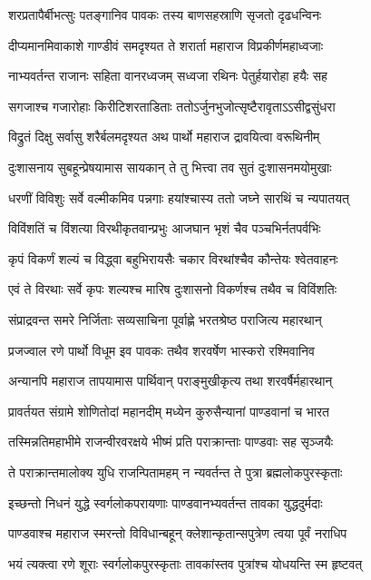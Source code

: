 \twolineshloka
{शरप्रतापैर्बीभत्सुः पतङ्गानिव पावकः}
{तस्य बाणसहस्राणि सृजतो दृढधन्विनः}


\twolineshloka
{दीप्यमानमिवाकाशे गाण्डीवं समदृश्यत}
{ते शरार्ता महाराज विप्रकीर्णमहाध्वजाः}


\twolineshloka
{नाभ्यवर्तन्त राजानः सहिता वानरध्वजम्}
{सध्वजा रथिनः पेतुर्हयारोहा हयैः सह}


\twolineshloka
{सगजाश्च गजारोहाः किरीटिशरताडिताः}
{ततोऽर्जुनभुजोत्सृष्टैरावृताऽऽसीद्वसुंधरा}


\twolineshloka
{विद्रुतं दिक्षु सर्वासु शरैर्बलमदृश्यत}
{अथ पार्थो महाराज द्रावयित्वा वरूथिनीम्}


\twolineshloka
{दुःशासनाय सुबहून्प्रेषयामास सायकान्}
{ते तु भित्त्वा तव सुतं दुःशासनमयोमुखाः}


\twolineshloka
{धरणीं विविशुः सर्वे वल्मीकमिव पन्नगाः}
{हयांश्चास्य ततो जघ्ने सारथिं च न्यपातयत्}


\twolineshloka
{विविंशतिं च विंशत्या विरथीकृतवान्प्रभुः}
{आजघान भृशं चैव पञ्चभिर्नतपर्वभिः}


\twolineshloka
{कृपं विकर्णं शल्यं च विद्ध्वा बहुभिरायसैः}
{चकार विरथांश्चैव कौन्तेयः श्वेतवाहनः}


\twolineshloka
{एवं ते विरथाः सर्वे कृपः शल्यश्च मारिष}
{दुःशासनो विकर्णश्च तथैव च विविंशतिः}


\twolineshloka
{संप्राद्रवन्त समरे निर्जिताः सव्यसाचिना}
{पूर्वाह्णे भरतश्रेष्ठ पराजित्य महारथान्}


\twolineshloka
{प्रजज्वाल रणे पार्थो विधूम इव पावकः}
{तथैव शरवर्षेण भास्करो रश्मिवानिव}


\twolineshloka
{अन्यानपि महाराज तापयामास पार्थिवान्}
{पराङ्मुखीकृत्य तथा शरवर्षैर्महारथान्}


\twolineshloka
{प्रावर्तयत संग्रामे शोणितोदां महानदीम्}
{मध्येन कुरुसैन्यानां पाण्डवानां च भारत}


\twolineshloka
{तस्मिन्नतिमहाभीमे राजन्वीरवरक्षये}
{भीष्मं प्रति पराक्रान्ताः पाण्डवाः सह सृञ्जयैः}


\twolineshloka
{ते पराक्रान्तमालोक्य युधि राजन्पितामहम्}
{न न्यवर्तन्त ते पुत्रा ब्रह्मलोकपुरस्कृताः}


\twolineshloka
{इच्छन्तो निधनं युद्धे स्वर्गलोकपरायणाः}
{पाण्डवानभ्यवर्तन्त तावका युद्धदुर्मदाः}


\twolineshloka
{पाण्डवाश्च महाराज स्मरन्तो विविधान्बहून्}
{क्लेशान्कृतान्सपुत्रेण त्वया पूर्वं नराधिप}


\twolineshloka
{भयं त्यक्त्वा रणे शूराः स्वर्गलोकपुरस्कृताः}
{तावकांस्तव पुत्रांश्च योधयन्ति स्म हृष्टवत्}


